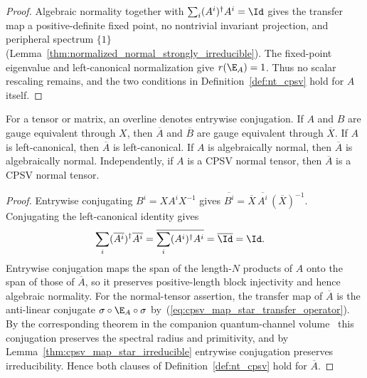 \begin{proof}\leanok
    Algebraic normality together with
    $\sum_i(A^i)^\dagger A^i=\Id$ gives the transfer map a positive-definite
    fixed point, no nontrivial invariant projection, and peripheral spectrum
    $\{1\}$ (Lemma~\ref{thm:normalized_normal_strongly_irreducible}). The fixed-point
    eigenvalue and left-canonical normalization give $r(\E_A)=1$. Thus no
    scalar rescaling remains, and the two conditions in
    Definition~\ref{def:nt_cpsv} hold for $A$ itself.
\end{proof}

\begin{lemma}
    \label{thm:cpsv_map_star_preservation}
    \leanok
    For a tensor or matrix, an overline denotes entrywise conjugation. If $A$
    and $B$ are gauge equivalent through $X$, then $\overline A$ and
    $\overline B$ are gauge equivalent through $\overline X$. If $A$ is
    left-canonical, then $\overline A$ is left-canonical. If $A$ is
    algebraically normal, then $\overline A$ is algebraically normal.
    Independently, if $A$
    is a CPSV normal tensor, then $\overline A$ is a CPSV normal tensor.
\end{lemma}

\begin{proof}\leanok
    Entrywise conjugating $B^i=X A^i X^{-1}$ gives
    $\overline{B^i}=\overline X\,\overline{A^i}\,(\overline X)^{-1}$.
    Conjugating the left-canonical identity gives
    \begin{align}
        \sum_i(\overline{A^i})^\dagger\overline{A^i}
         & =\overline{\sum_i(A^i)^\dagger A^i}
        =\overline{\Id}=\Id.
    \end{align}
    Entrywise conjugation maps the span of the length-$N$ products of $A$
    onto the span of those of $\overline A$, so it preserves positive-length
    block injectivity and hence algebraic normality.
    For the normal-tensor assertion, the transfer map of $\overline A$ is the
    anti-linear conjugate $\sigma\circ\E_A\circ\sigma$
    by~(\ref{eq:cpsv_map_star_transfer_operator}). By
    the corresponding theorem in the companion quantum-channel volume~\cite[``Entrywise conjugation preserves peripheral eigenvalues'']{QICLean2026Blueprint} this conjugation
    preserves the spectral radius and primitivity, and by
    Lemma~\ref{thm:cpsv_map_star_irreducible} entrywise conjugation
    preserves irreducibility. Hence both clauses of
    Definition~\ref{def:nt_cpsv} hold for $\overline A$.
\end{proof}

